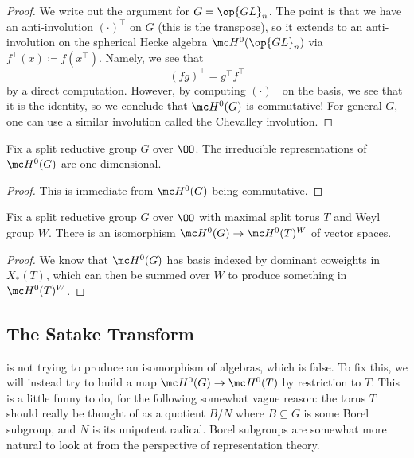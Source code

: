 \documentclass{article}
\begin{document}
\begin{proof}
	We write out the argument for $G=\op{GL}_n$. The point is that we have an anti-involution $(\cdot)^\intercal$ on $G$ (this is the transpose), so it extends to an anti-involution on the spherical Hecke algebra $\mc H^0({\op{GL}_n})$ via $f^\intercal(x)\coloneqq f(x^\intercal)$. Namely, we see that
	\[(fg)^\intercal=g^\intercal f^\intercal\]
	by a direct computation. However, by computing $(\cdot)^\intercal$ on the basis, we see that it is the identity, so we conclude that $\mc H^0(G)$ is commutative! For general $G$, one can use a similar involution called the Chevalley involution.
\end{proof}
\begin{corollary}
	Fix a split reductive group $G$ over $\OO$. The irreducible representations of $\mc H^0(G)$ are one-dimensional. 
\end{corollary}
\begin{proof}
	This is immediate from $\mc H^0(G)$ being commutative.
\end{proof}
\begin{corollary} \label{cor:towards-satake}
	Fix a split reductive group $G$ over $\OO$ with maximal split torus $T$ and Weyl group $W$. There is an isomorphism $\mc H^0(G)\to\mc H^0(T)^W$ of vector spaces.
\end{corollary}
\begin{proof}
	We know that $\mc H^0(G)$ has basis indexed by dominant coweights in $X_*(T)$, which can then be summed over $W$ to produce something in $\mc H^0(T)^W$.
\end{proof}

\subsection{The Satake Transform}
 is not trying to produce an isomorphism of algebras, which is false. To fix this, we will instead try to build a map $\mc H^0(G)\to\mc H^0(T)$ by restriction to $T$. This is a little funny to do, for the following somewhat vague reason: the torus $T$ should really be thought of as a quotient $B/N$ where $B\subseteq G$ is some Borel subgroup, and $N$ is its unipotent radical. Borel subgroups are somewhat more natural to look at from the perspective of representation theory.
\end{document}
